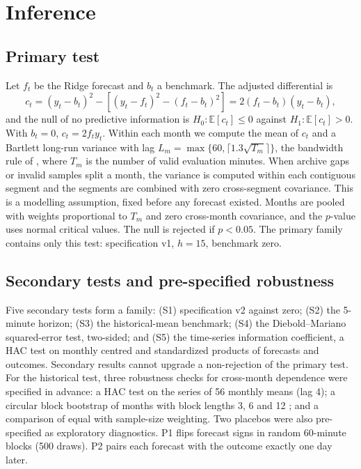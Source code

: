 \documentclass[11pt]{article}
\begin{document}
\section{Inference}

\subsection{Primary test}
Let $f_t$ be the Ridge forecast and $b_t$ a benchmark. The \citet{clarkwest2007} adjusted differential is
\begin{equation}
c_t=(y_t-b_t)^2-\left[(y_t-f_t)^2-(f_t-b_t)^2\right]=2(f_t-b_t)(y_t-b_t),
\end{equation}
and the null of no predictive information is $H_0:\mathbb{E}[c_t]\le0$ against $H_1:\mathbb{E}[c_t]>0$. With $b_t=0$, $c_t=2f_ty_t$. Within each month we compute the mean of $c_t$ and a Bartlett long-run variance with lag $L_m=\max\{60,\lceil1.3\sqrt{T_m}\rceil\}$, the bandwidth rule of \citet{lazarus2018}, where $T_m$ is the number of valid evaluation minutes. When archive gaps or invalid samples split a month, the variance is computed within each contiguous segment and the segments are combined with zero cross-segment covariance. This is a modelling assumption, fixed before any forecast existed. Months are pooled with weights proportional to $T_m$ and zero cross-month covariance, and the $p$-value uses normal critical values. The null is rejected if $p<0.05$. The primary family contains only this test: specification v1, $h=15$, benchmark zero.

\subsection{Secondary tests and pre-specified robustness}
Five secondary tests form a \citet{holm1979} family: (S1) specification v2 against zero; (S2) the 5-minute horizon; (S3) the historical-mean benchmark; (S4) the Diebold--Mariano squared-error test, two-sided; and (S5) the time-series information coefficient, a HAC test on monthly centred and standardized products of forecasts and outcomes. Secondary results cannot upgrade a non-rejection of the primary test. For the historical test, three robustness checks for cross-month dependence were specified in advance: a HAC test on the series of 56 monthly means (lag 4); a circular block bootstrap of months with block lengths 3, 6 and 12 \citep{kunsch1989}; and a comparison of equal with sample-size weighting. Two placebos were also pre-specified as exploratory diagnostics. P1 flips forecast signs in random 60-minute blocks (500 draws). P2 pairs each forecast with the outcome exactly one day later.
\end{document}
